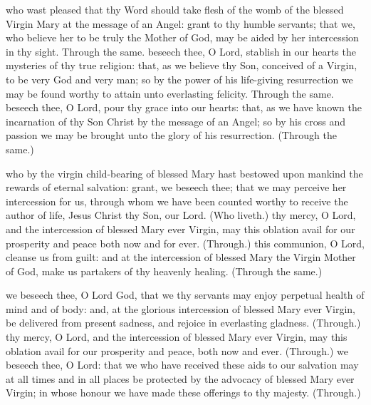    \fancyhead[RO,LE]{}
   \fancyhead[RE,LO]{}

   \begin{multicols}{2}
   \label{SPMaryInAdvent}
    who wast pleased that thy Word should take flesh of the womb of the blessed Virgin Mary at the message of an Angel: grant to thy humble servants; that we, who believe her to be truly the Mother of God, may be aided by her intercession in thy sight. Through the same.
    beseech thee, O Lord, stablish in our hearts the mysteries of thy true religion: that, as we believe thy Son, conceived of a Virgin, to be very God and very man; so by the power of his life-giving resurrection we may be found worthy to attain unto everlasting felicity. Through the same.
    beseech thee, O Lord, pour thy grace into our hearts: that, as we have known the incarnation of thy Son Christ by the message of an Angel; so by his cross and passion we may be brought unto the glory of his resurrection. (Through the same.)

    \label{SPMaryPostChristmas}
     who by the virgin child-bearing of blessed Mary hast bestowed upon mankind the rewards of eternal salvation: grant, we beseech thee; that we may perceive her intercession for us, through whom we have been counted worthy to receive the author of life, Jesus Christ thy Son, our Lord. (Who liveth.)
     thy mercy, O Lord, and the intercession of blessed Mary ever Virgin, may this oblation avail for our prosperity and peace both now and for ever. (Through.)
     this communion, O Lord, cleanse us from guilt: and at the intercession of blessed Mary the Virgin Mother of God, make us partakers of thy heavenly healing. (Through the same.)
    
    \label{SPMaryInEaster}
     we beseech thee, O Lord God, that we thy servants may enjoy perpetual health of mind and of body: and, at the glorious intercession of blessed Mary ever Virgin, be delivered from present sadness, and rejoice in everlasting gladness. (Through.)
     thy mercy, O Lord, and the intercession of blessed Mary ever Virgin, may this oblation avail for our prosperity and peace, both now and ever. (Through.)
     we beseech thee, O Lord: that we who have received these aids to our salvation may at all times and in all places be protected by the advocacy of blessed Mary ever Virgin; in whose honour we have made these offerings to thy majesty. (Through.)\\


\end{multicols}
